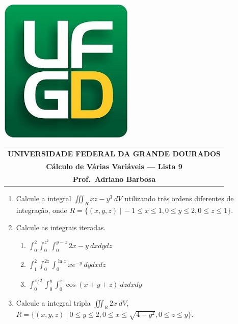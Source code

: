 \documentclass[a4paper,5pt]{amsbook}
\newcommand{\ds}{\displaystyle}
\begin{document}
\thispagestyle{empty}
\pagestyle{empty}
\begin{minipage}[h]{0.14\textwidth}
	\includegraphics[scale=0.24]{../../ufgd.png}
\end{minipage}
\begin{minipage}[h]{\textwidth}
\begin{tabular}{c}
{{\bf UNIVERSIDADE FEDERAL DA GRANDE DOURADOS}}\\
{{\bf C\'alculo de V\'arias Vari\'aveis --- Lista 9}}\\
{{\bf Prof.\ Adriano Barbosa}}\\
\end{tabular}
\vspace{-0.45cm}
%
\end{minipage}


\vspace{1cm}
\begin{enumerate}
    \setlength\itemsep{0.5cm}
    \item Calcule a integral $\ds\iiint_R xz-y^3\ dV$ utilizando tr\^es ordens
    diferentes de integra\c{c}\~ao, onde $R=\{(x,y,z)\ |\ -1\le x\le 1, 0\le y\le 2,
    0\le z\le 1\}$.

    \item Calcule as integrais iteradas.
        \begin{enumerate}
            \setlength\itemsep{0.3cm}
            \item $\ds\int_0^2 \int_0^{z^2} \int_0^{y-z} 2x-y\ dxdydz$
            \item $\ds\int_1^2 \int_0^{2z} \int_0^{\ln{x}} xe^{-y}\ dydxdz$
            \item $\ds\int_0^{\pi/2} \int_0^y \int_0^x \cos{(x+y+z)}\ dzdxdy$
        \end{enumerate}

    \item Calcule a integral tripla $\ds\iiint_R 2x\ dV$, $R=\{(x,y,z)\ |\ 0\le
    y\le 2, 0\le x\le \sqrt{4-y^2}, 0\le z\le y\}$.
\end{enumerate}
\end{document}
